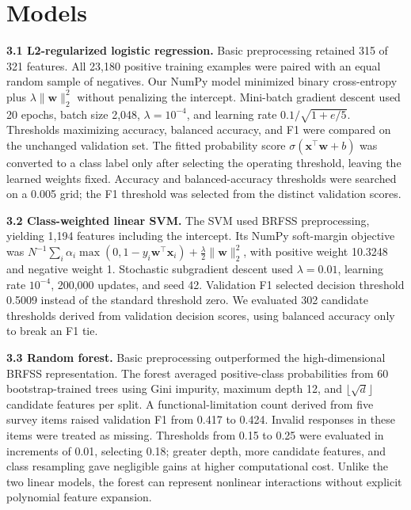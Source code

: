 \documentclass[10pt,a4paper]{article}
\begin{document}
\section{Models}

\textbf{3.1 L2-regularized logistic regression.}
Basic preprocessing retained 315 of 321 features. All 23,180 positive training
examples were paired with an equal random sample of negatives. Our NumPy model
minimized binary cross-entropy plus $\lambda\lVert\mathbf{w}\rVert_2^2$
without penalizing the intercept. Mini-batch gradient descent used 20 epochs,
batch size 2,048, $\lambda=10^{-4}$, and learning rate
$0.1/\sqrt{1+e/5}$. Thresholds maximizing accuracy, balanced accuracy, and F1
were compared on the unchanged validation set. The fitted probability score
$\sigma(\mathbf{x}^{\top}\mathbf{w}+b)$ was converted to a class label only
after selecting the operating threshold, leaving the learned weights fixed.
Accuracy and balanced-accuracy thresholds were searched on a 0.005 grid; the
F1 threshold was selected from the distinct validation scores.

\textbf{3.2 Class-weighted linear SVM.}
The SVM used BRFSS preprocessing, yielding 1,194 features including the
intercept. Its NumPy soft-margin objective was
$N^{-1}\sum_i\alpha_i\max(0,1-y_i\mathbf{w}^{\top}\mathbf{x}_i)
+\frac{\lambda}{2}\lVert\mathbf{w}\rVert_2^2$, with positive weight 10.3248
and negative weight 1. Stochastic subgradient descent used
$\lambda=0.01$, learning rate $10^{-4}$, 200,000 updates, and seed 42.
Validation F1 selected decision threshold 0.5009 instead of the standard
threshold zero. We evaluated 302 candidate thresholds derived from validation
decision scores, using balanced accuracy only to break an F1 tie.

\textbf{3.3 Random forest.}
Basic preprocessing outperformed the high-dimensional BRFSS representation.
The forest averaged positive-class probabilities from 60 bootstrap-trained
trees using Gini impurity, maximum depth 12, and
$\lfloor\sqrt{d}\rfloor$ candidate features per split. A functional-limitation
count derived from five survey items raised validation F1 from 0.417 to 0.424.
Invalid responses in these items were treated as missing. Thresholds from 0.15
to 0.25 were evaluated in increments of 0.01, selecting 0.18; greater depth,
more candidate features, and class resampling gave negligible gains at higher
computational cost. Unlike the two linear models, the forest can represent
nonlinear interactions without explicit polynomial feature expansion.
\end{document}

